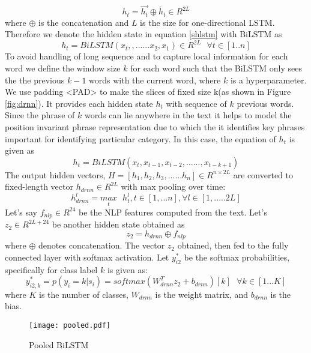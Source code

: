 \documentclass[sigconf]{acmart}
\begin{document}
\begin{equation}
    h_t = \overrightarrow{h_t} \oplus \overleftarrow{h_t} \in R^{2L}
\end{equation}
where $\oplus$ is the concatenation and $L$ is the size for one-directional LSTM. Therefore we denote the hidden state in equation \ref{shlstm} with BiLSTM as 
\begin{equation}
    h_t = BiLSTM(x_{t}, ,......x_{2}, x_{1}) \in R^{2L}\textrm{ } \forall t\in [1..n]
\end{equation}
To avoid handling of long sequence and to capture local information for each word we define the window size $k$ for each word such that the BiLSTM only sees the the previous $k-1$ words with the current word, where $k$ is a hyperparameter\cite{wang2018disconnected}. We use padding <PAD> to make the slices of fixed size k(as shown in Figure \ref{fig:drnn}). It provides each hidden state $h_t$ with sequence of $k$ previous words. Since the phrase of $k$ words can lie anywhere in the text it helps to model the position invariant phrase representation due to which the it identifies key phrases important for identifying particular category. In this case, the equation of $h_t$ is given as 
\begin{equation}
    h_t = BiLSTM(x_{t}, x_{t-1}, x_{t-2}, ......, x_{t-k+1}) 
\end{equation}
The output hidden vectors, $H = [h_1, h_2, h_3, ...... h_n] \in R^{n \times 2L}$ are converted to fixed-length vector $h_{drnn} \in R^{2L}$ with max pooling over time:  
\begin{equation}
    h_{drnn}^{l} = \underset{t}{max}\textrm{ }h_{t}^{l}, t \in [1,...n], \forall l \in [1,.....2L] 
\end{equation}
Let's say $f_{nlp} \in R^{24}$ be the NLP features computed from the text. Let's $z_2 \in R^{2L + 24}$ be another hidden state obtained as
\begin{equation}
    z_2 = h_{drnn} \oplus f_{nlp}   
\end{equation}
where $\oplus$ denotes concatenation. The vector $z_2$ obtained, then fed to the fully connected layer with softmax activation. Let $y_{i2}^*$ be the softmax probabilities, specifically for class label $k$ is given as:
\begin{equation}
    y_{i2,k}^{*} = p(y_i = k |s_i) = softmax(W_{drnn}^T z_2 + b_{drnn})[k]\textrm{ } \forall k \in [1...K]
    \label{softdrnn}
\end{equation}
where $K$ is the number of classes, $W_{drnn}$ is the weight matrix, and
$b_{drnn}$ is the bias.
\begin{figure}[t]
    \centering
    \texttt{[image: pooled.pdf]}
    \caption{Pooled BiLSTM}
    \label{fig:pooled}
    \vspace{-4mm}
\end{figure}
\raggedbottom
\end{document}
